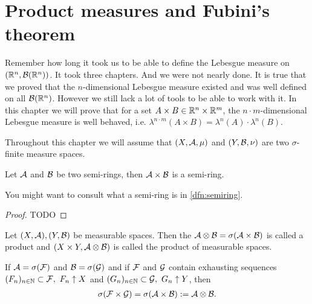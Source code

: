 

\chapter{Product measures and Fubini's theorem}

Remember how long it took us to be able to define the Lebesgue measure on $(\mathbb{R}^n, \mathcal{B}(\mathbb{R}^n))$. It took three chapters. And we were not nearly done. It is true that we proved that the $n$-dimensional Lebesgue measure existed and was well defined on all $\mathcal{B}(\mathbb{R}^n)$. However we still lack a lot of tools to be able to work with it. In this chapter we will prove that for a set $A \times B \in \mathbb{R}^n \times \mathbb{R}^m$, the $n\cdot m$-dimensional Lebesgue measure is well behaved, i.e. $\lambda^{n\cdot m}(A \times B) = \lambda^n(A) \cdot \lambda^n(B)$.

Throughout this chapter we will assume that $(X, \mathcal{A}, \mu)$ and $(Y, \mathcal{B}, \nu)$ are two $\sigma$-finite measure spaces.

\begin{lem}
	Let $\mathcal{A}$ and $\mathcal{B}$ be two semi-rings, then $\mathcal{A} \times \mathcal{B}$ is a semi-ring.
\end{lem}

You might want to consult what a semi-ring is in \autoref{dfn:semiring}.

\begin{proof}
	TODO
\end{proof}

\begin{dfn}
	Let $(X, \mathcal{A}), (Y, \mathcal{B})$ be measurable spaces. Then the \siga $\mathcal{A} \otimes \mathcal{B} = \sigma(\mathcal{A} \times \mathcal{B})$ is called a product \siga and $(X \times Y, \mathcal{A} \otimes \mathcal{B})$ is called the product of measurable spaces.
\end{dfn}

\begin{lem}
	If $\mathcal{A} = \sigma(\mathcal{F})$ and $\mathcal{B} = \sigma(\mathcal{G})$ and if $\mathcal{F}$ and $\mathcal{G}$ contain exhausting sequences $(F_n)_{n\in\mathbb{N}} \subset \mathcal{F},\ F_n \uparrow X$ and $(G_n)_{n\in\N} \subset \calG,\ G_n \uparrow Y$, then
	\begin{align}
		\sigma(\mathcal{F} \times \mathcal{G}) = \sigma (\mathcal{A} \times \mathcal{B}) := \mathcal{A} \otimes \mathcal{B}.
	\end{align}
\end{lem}


